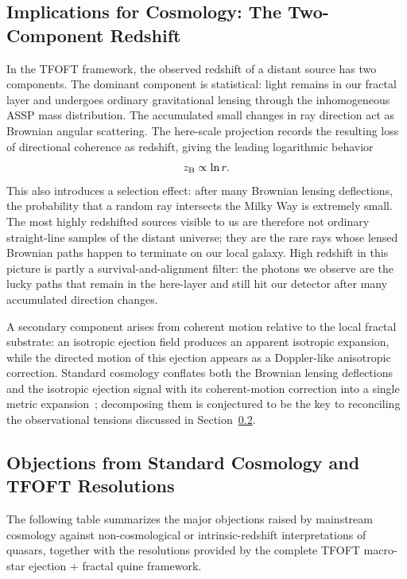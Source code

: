 \documentclass[11pt,a4paper]{article}
\begin{document}
\subsection{Implications for Cosmology: The Two-Component Redshift}

In the TFOFT framework, the observed redshift of a distant source has two components. The dominant component is statistical: light remains in our fractal layer and undergoes ordinary gravitational lensing through the inhomogeneous ASSP mass distribution. The accumulated small changes in ray direction act as Brownian angular scattering. The here-scale projection records the resulting loss of directional coherence as redshift, giving the leading logarithmic behavior
\[
z_{\rm B}\propto \ln r.
\]
This also introduces a selection effect: after many Brownian lensing deflections, the probability that a random ray intersects the Milky Way is extremely small. The most highly redshifted sources visible to us are therefore not ordinary straight-line samples of the distant universe; they are the rare rays whose lensed Brownian paths happen to terminate on our local galaxy. High redshift in this picture is partly a survival-and-alignment filter: the photons we observe are the lucky paths that remain in the here-layer and still hit our detector after many accumulated direction changes.

A secondary component arises from coherent motion relative to the local fractal substrate: an isotropic ejection field produces an apparent isotropic expansion, while the directed motion of this ejection appears as a Doppler-like anisotropic correction. Standard cosmology conflates both the Brownian lensing deflections and the isotropic ejection signal with its coherent-motion correction into a single metric expansion~\cite{Planck2018VI}; decomposing them is conjectured to be the key to reconciling the observational tensions discussed in Section~\ref{sec:tensions}.



\subsection{Objections from Standard Cosmology and TFOFT Resolutions}
\label{sec:tensions}

The following table summarizes the major objections raised by mainstream cosmology against non-cosmological or intrinsic-redshift interpretations of quasars, together with the resolutions provided by the complete TFOFT macro-star ejection + fractal quine framework.
\end{document}
